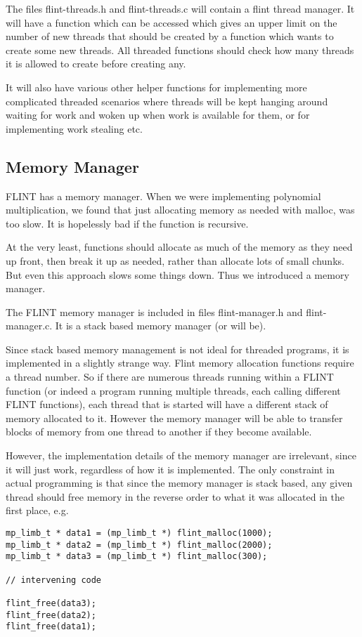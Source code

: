 \documentclass[a4paper,10pt]{article}
\begin{document}
The files flint-threads.h and flint-threads.c will contain a flint thread manager. It will have a function which can be accessed which gives an upper limit on the number of new threads that should be created by a function which wants to create some new threads. All threaded functions should check how many threads it is allowed to create before creating any.

It will also have various other helper functions for implementing more complicated threaded scenarios where threads will be kept hanging around waiting for work and woken up when work is available for them, or for implementing work stealing etc.

\subsection{Memory Manager}
FLINT has a memory manager. When we were implementing polynomial multiplication, we found that just allocating memory as needed with malloc, was too slow. It is hopelessly bad if the function is recursive.

At the very least, functions should allocate as much of the memory as they need up front, then break it up as needed, rather than allocate lots of small chunks. But even this approach slows some things down. Thus we introduced a memory manager.

The FLINT memory manager is included in files flint-manager.h and flint-manager.c. It is a stack based memory manager (or will be). 

Since stack based memory management is not ideal for threaded programs, it is implemented in a slightly strange way. Flint memory allocation functions require a thread number. So if there are numerous threads running within a FLINT function (or indeed a program running multiple threads, each calling different FLINT functions), each thread that is started will have a different stack of memory allocated to it. However the memory manager will be able to transfer blocks of memory from one thread to another if they become available. 

However, the implementation details of the memory manager are irrelevant, since it will just work, regardless of how it is implemented. The only constraint in actual programming is that since the memory manager is stack based, any given thread should free memory in the reverse order to what it was allocated in the first place, e.g.

\begin{verbatim}mp_limb_t * data1 = (mp_limb_t *) flint_malloc(1000);
mp_limb_t * data2 = (mp_limb_t *) flint_malloc(2000);
mp_limb_t * data3 = (mp_limb_t *) flint_malloc(300);

// intervening code

flint_free(data3);
flint_free(data2);
flint_free(data1);\end{verbatim}
\end{document}
